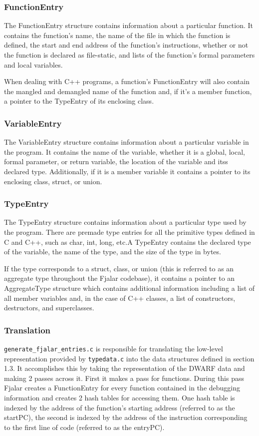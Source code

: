 \documentclass{article}
\begin{document}
\subsubsection{FunctionEntry}
The FunctionEntry structure contains information about a particular
function. It contains the function's name, the name of the file in which  
the function is defined, the start and end address of the function's 
instructions, whether or not the function is declared as file-static,
and lists of the function's formal parameters and local variables. 

When dealing with C++ programs, a function's FunctionEntry will also  
contain the mangled and demangled name of the function and, if it's a
member function, a pointer to the TypeEntry of its enclosing class.

\subsubsection{VariableEntry}
The VariableEntry structure contains information about a particular
variable in the program. It contains the name of the variable, whether
it is a global, local, formal parameter, or return variable, the
location of the variable and itss declared type. Additionally,
if it is a member variable it contains a pointer to its enclosing
class, struct, or union.

\subsubsection{TypeEntry}
The TypeEntry structure contains information about a particular type used
by the program. There are premade type entries for all the primitive
types defined in C and C++, such as char, int, long, etc.A TypeEntry
contains  the
declared type of the variable, the name of the type, and the size of
the type in bytes.

If the type corresponds to a struct, class, or union (this is referred to
as an aggregate type throughout the Fjalar codebase), it contains a pointer
to an AggregateType structure which contains additional information
including a list of all member variables and, in the case of C++
classes, a list of constructors, destructors, and superclasses.

\subsubsection{Translation}
\texttt{generate\_fjalar\_entries.c} is responsible for translating
the low-level representation provided by \texttt{typedata.c} into the
data structures defined in section 1.3. It
accomplishes this by taking the representation of the DWARF data and
making 2 passes across it. First it makes a pass for functions. During
this pass Fjalar creates a FunctionEntry for every function contained
in the debugging information and creates 2 hash tables for accessing
them. One hash table is indexed by the address of the function's
starting address (referred to as the startPC), the second is indexed
by the address of the instruction corresponding to the first line of
code (referred to as the entryPC).
\end{document}
